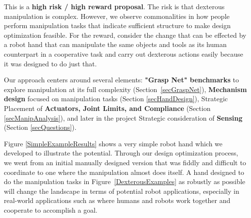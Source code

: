 This is a {\bf high risk / high reward proposal}.   The risk is that dexterous manipulation is  complex.   However, we observe commonalities in how people perform manipulation tasks that indicate sufficient structure to make design optimization feasible.   For the reward, consider the change that can be effected by a robot hand that can manipulate the same objects and tools as its human counterpart in a cooperative task and carry out dexterous actions easily because it was designed to do just that.

Our approach centers around several elements:  {\bf "Grasp Net" benchmarks} to explore manipulation at its full complexity (Section~\ref{secGraspNet}), {\bf Mechanism design} focused on manipulation tasks (Section \ref{secHandDesign}),  Strategic Placement of {\bf Actuators, Joint Limits, and Compliance} (Section \ref{secManipAnalysis}), and later in the project Strategic consideration of {\bf Sensing} (Section \ref{secQuestions}).

Figure \ref{SimpleExampleResults} shows a very simple robot hand which we developed to illustrate the potential.  Through our design optimization process, we went from an initial manually designed version that was fiddly and difficult to coordinate to one where the manipulation almost does itself.  A hand designed to do the manipulation tasks in Figure~\ref{DexterousExamples} as robustly as possible will change the landscape in terms of potential robot applications, especially in real-world applications such as where humans and robots work together and cooperate to accomplish a goal.


	

